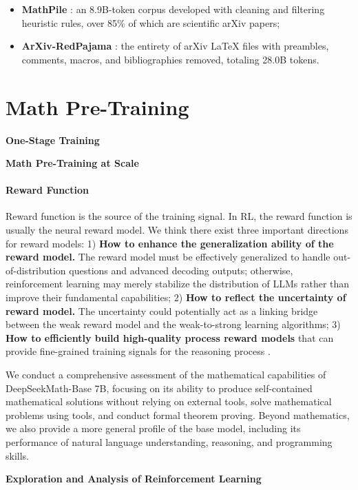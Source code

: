 \begin{itemize}[topsep=0pt]
\begin{itemize}[topsep=0pt]
    \item \textbf{MathPile} \citep{mathpile}: an 8.9B-token corpus developed with cleaning and filtering heuristic rules, over 85\% of which are scientific arXiv papers;
    \item \textbf{ArXiv-RedPajama} \citep{redpajama}: the entirety of arXiv LaTeX files with preambles, comments, macros, and bibliographies removed, totaling 28.0B tokens.
\end{itemize}

\section{Math Pre-Training}

\textbf{One-Stage Training}

\textbf{Math Pre-Training at Scale}

\paragraph{Reward Function} Reward function is the source of the training signal. In RL, the reward function is usually the neural reward model. We think there exist three important directions for reward models: 1) \textbf{How to enhance the generalization ability of the reward model.} The reward model must be effectively generalized to handle out-of-distribution questions and advanced decoding outputs; otherwise, reinforcement learning may merely stabilize the distribution of LLMs rather than improve their fundamental capabilities; 2) \textbf{How to reflect the uncertainty of reward model.} The uncertainty could potentially act as a linking bridge between the weak reward model and the weak-to-strong learning algorithms; 3) \textbf{How to efficiently build high-quality process reward models} that can provide fine-grained training signals for the reasoning process \citep{lightman2023let,wang2023math}.

We conduct a comprehensive assessment of the mathematical capabilities of DeepSeekMath-Base 7B, focusing on its ability to produce self-contained mathematical solutions without relying on external tools, solve mathematical problems using tools, and conduct formal theorem proving. Beyond mathematics, we also provide a more general profile of the base model, including its performance of natural language understanding, reasoning, and programming skills.

\textbf{Exploration and Analysis of Reinforcement Learning}


\end{itemize}
